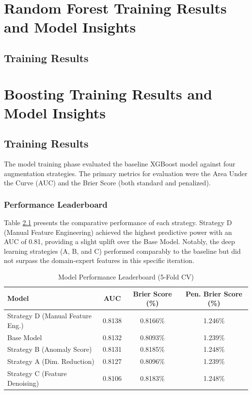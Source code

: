 \documentclass{report}\usepackage[]{graphicx}\usepackage[]{xcolor}
\begin{document}

\chapter{Random Forest Training Results and Model Insights}

\section{Training Results}


\chapter{Boosting Training Results and Model Insights}

\section{Training Results}

The model training phase evaluated the baseline XGBoost model against four augmentation strategies. The primary metrics for evaluation were the Area Under the Curve (AUC) and the Brier Score (both standard and penalized).

\subsection{Performance Leaderboard}

Table \ref{tab:leaderboard} presents the comparative performance of each strategy. Strategy D (Manual Feature Engineering) achieved the highest predictive power with an AUC of 0.81, providing a slight uplift over the Base Model. Notably, the deep learning strategies (A, B, and C) performed comparably to the baseline but did not surpass the domain-expert features in this specific iteration.

\begin{table}[h]
    \centering
    \caption{Model Performance Leaderboard (5-Fold CV)}
    \label{tab:leaderboard}
    \begin{tabular}{lccc}
        \hline
        \textbf{Model} & \textbf{AUC} & \textbf{Brier Score (\%)} & \textbf{Pen. Brier Score (\%)} \\
        \hline
        Strategy D (Manual Feature Eng.) & 0.8138 & 0.8166\% & 1.246\% \\
        Base Model & 0.8132 & 0.8093\% & 1.239\% \\
        Strategy B (Anomaly Score) & 0.8131 & 0.8185\% & 1.248\% \\
        Strategy A (Dim. Reduction) & 0.8127 & 0.8096\% & 1.239\% \\
        Strategy C (Feature Denoising) & 0.8106 & 0.8183\% & 1.248\% \\
        \hline
    \end{tabular}
\end{table}
\end{document}
